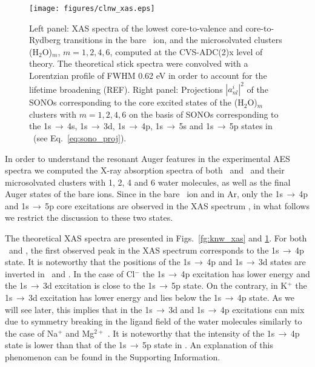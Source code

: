 \begin{figure}
\centering
\texttt{[image: figures/clnw\_xas.eps]}
\caption{Left panel: XAS spectra of the lowest core-to-valence and core-to-Rydberg transitions in the bare \cli~ion, and the microsolvated clusters \cli(H$_2$O)$_m$, $m = 1, 2, 4, 6$, computed at the CVS-ADC(2)x level of theory. The theoretical stick spectra were convolved with a Lorentzian profile of FWHM 0.62 eV in order to account for the lifetime broadening (REF). Right panel: Projections $|a_{nl}^{i}|^2$ of the SONOs corresponding to the core excited states of the \cli(H$_2$O)$_m$ clusters with $m = 1, 2, 4, 6$ on the basis of SONOs corresponding to the 1s$\,\rightarrow\,$4s, 1s$\,\rightarrow\,$3d, 1s$\,\rightarrow\,$4p, 1s$\,\rightarrow\,$5s and 1s$\,\rightarrow\,$5p states in \cli~(see Eq.\ \eqref{eq:sono_proj}).}
\label{fg:clnw_xas}
\end{figure}


In order to understand the resonant Auger features in the experimental AES spectra we computed the X-ray absorption spectra of both \ki~and \cli~and their microsolvated clusters with 1, 2, 4 and 6 water molecules, as well as the final Auger states of the bare ions. Since in the bare \ki~ion and in Ar, only the 1s$\,\rightarrow\,$4p and 1s$\,\rightarrow\,$5p core excitations are observed in the XAS spectrum \citep{hertlein06:062715,ceolin15:022502}, in what follows we restrict the discussion to these two states.

The theoretical XAS spectra are presented in Figs.\ \ref{fg:knw_xas} and \ref{fg:clnw_xas}. For both \ki~and \cli, the first observed peak in the XAS spectrum corresponds to the 1s$\,\rightarrow\,$4p state. It is noteworthy that the positions of the 1s$\,\rightarrow\,$4p and 1s$\,\rightarrow\,$3d states are inverted in \ki~and \cli. In the case of Cl$^{-}$ the 1s$\,\rightarrow\,$4p excitation has lower energy and the 1s$\,\rightarrow\,$3d excitation is close to the 1s$\,\rightarrow\,$5p state. On the contrary, in K$^{+}$ the 1s$\,\rightarrow\,$3d excitation has lower energy and lies below the 1s$\,\rightarrow\,$4p state. As we will see later, this implies that in \ki the 1s$\,\rightarrow\,$3d and 1s$\,\rightarrow\,$4p excitations can mix due to symmetry breaking in the ligand field of the water molecules similarly to the case of Na$^{+}$ and Mg$^{2+}$ \citep{miteva16:16671}. It is noteworthy that the intensity of the 1s$\,\rightarrow\,$4p state is lower than that of the 1s$\,\rightarrow\,$5p state in \cli. An explanation of this phenomenon can be found in the Supporting Information.

